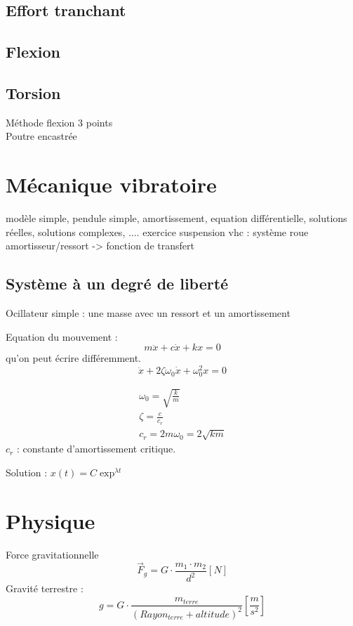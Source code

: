 	\subsection{Effort tranchant}
	\subsection{Flexion}
	
	\subsection{Torsion}
	
	Méthode flexion 3 points\\
	Poutre encastrée
	
	
	\newpage
	\section{Mécanique vibratoire}
	modèle simple, pendule simple, amortissement, equation différentielle, solutions réelles, solutions complexes, ....
	exercice suspension vhc : système roue amortisseur/ressort -> fonction de transfert
	
	\subsection{Système à un degré de liberté}
	
	Ocillateur simple : une masse avec un ressort et un amortissement
	
	Equation du mouvement :
	\begin{equation}
	m \ddot{x} + c \dot{x}+k x =0
	\end{equation}
	qu'on peut écrire différemment. 
	\begin{equation}
	\ddot{x} + 2\zeta \omega_0 \dot{x}+\omega_0^2  x =0
	\end{equation}
	
	\begin{eqnarray}
	\omega_0=\sqrt{\frac{k}{m}}\\
	\zeta=\frac{c}{c_r}\\
	c_r=2 m \omega_0=2\sqrt{km}
	\end{eqnarray}
	$c_r$ : constante d'amortissement critique. 
	
	Solution : $x(t)=C \exp^{\lambda t}$
	
	\newpage
	\section{Physique}
	Force gravitationnelle
	\begin{equation}
	\vec{F}_g=G\cdot \frac{m_1 \cdot m_2}{d^2} [N]
	\end{equation}
	Gravité terrestre : 
	\begin{equation}
	g=G\cdot \frac{m_{terre}}{(Rayon_{terre}+altitude)^2}[\frac{m}{s^2}]
	\end{equation}
	
